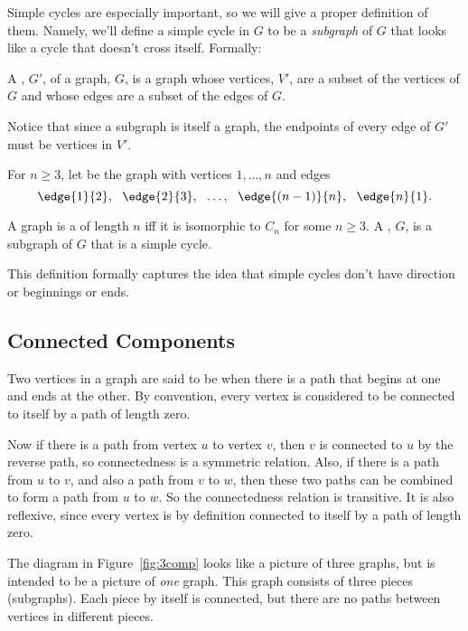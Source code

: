 Simple cycles are especially important, so we will give a proper
definition of them.  Namely, we'll define a simple cycle in $G$ to be a
\emph{subgraph} of $G$ that looks like a cycle that doesn't cross itself.
Formally:
\begin{definition}
A , $G'$, of a graph, $G$, is a graph whose vertices, $V'$,
are a subset of the vertices of $G$ and whose edges are a subset
of the edges of $G$.
\end{definition}
Notice that since a subgraph is itself a graph, the endpoints of every
edge of $G'$ must be vertices in $V'$.
\begin{definition}
  For $n \ge 3$, let  be the graph with vertices $1,\dots, n$
  and edges
\[
\edge{1}{2},\ \ \edge{2}{3},\ \ \dots,\ \ \edge{(n-1)}{n},\ \ \edge{n}{1}.
\]

A graph is a  of length $n$ iff it is isomorphic to $C_n$
for some $n \ge 3$.  A , $G$, is a subgraph
of $G$ that is a simple cycle.
\end{definition}
This definition formally captures the idea that simple cycles don't
have direction or beginnings or ends.


\subsection{Connected Components}
\begin{definition}
  Two vertices in a graph are said to be  when there is a
  path that begins at one and ends at the other.  By convention, every
  vertex is considered to be connected to itself by a path of length zero.
\end{definition}

\begin{staffnotes}

Now if there is a path from vertex $u$ to vertex $v$, then $v$ is
connected to $u$ by the reverse path, so connectedness is a symmetric
relation.  Also, if there is a path from $u$ to $v$, and also a path from
$v$ to $w$, then these two paths can be combined to form a path from $u$
to $w$.  So the connectedness relation is transitive.  It is also
reflexive, since every vertex is by definition connected to itself by a
path of length zero.

\end{staffnotes}

The diagram in Figure~\ref{fig:3comp} looks like a picture of three
graphs, but is intended to be a picture of \emph{one} graph.  This graph
consists of three pieces (subgraphs).  Each piece by itself is connected,
but there are no paths between vertices in different pieces.

